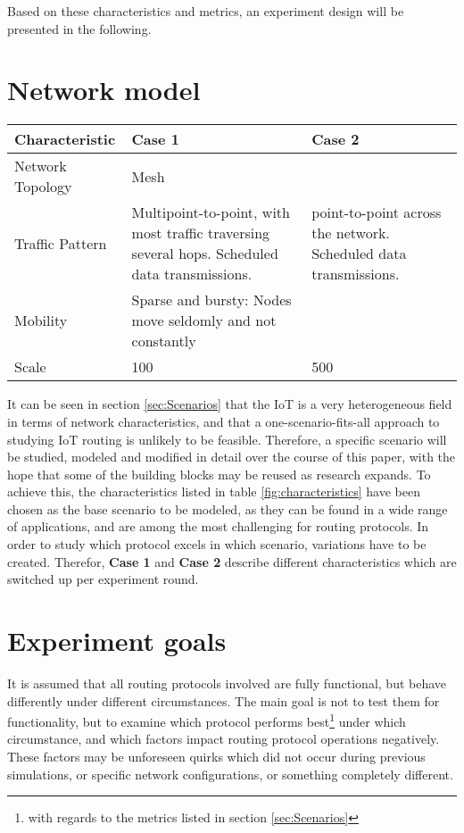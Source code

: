 \documentclass{acm_proc_article-sp}
\begin{document}
Based on these characteristics and metrics, an experiment design will be presented in the following.

\section{Network model}
\label{sec:Model}
\begin{table*}[t]
    \begin{tabularx}{\textwidth}{l | X | X  }
      Characteristic & Case 1 & Case 2 \\
      \hline
      Network Topology & Mesh & \\
      Traffic Pattern & Multipoint-to-point, with most traffic traversing several hops. Scheduled data transmissions. & point-to-point across the network. Scheduled data transmissions. \\
      Mobility & Sparse and bursty: Nodes move seldomly and not constantly & \\
      Scale & 100 & 500\\
    \end{tabularx}
    \caption{Characteristics of the modeled network(s)}
    \label{fig:characteristics}
\end{table*}

It can be seen in section \ref{sec:Scenarios} that the IoT is a very heterogeneous field in terms of network characteristics, and that a one-scenario-fits-all approach to studying IoT routing is unlikely to be feasible. Therefore, a specific scenario will be studied, modeled and modified in detail over the course of this paper, with the hope that some of the building blocks may be reused as research expands. To achieve this, the characteristics listed in table \ref{fig:characteristics} have been chosen as the base scenario to be modeled, as they can be found in a wide range of applications, and are among the most challenging for routing protocols.
In order to study which protocol excels in which scenario, variations have to be created. Therefor, \textbf{Case 1} and \textbf{Case 2} describe different characteristics which are switched up per experiment round.


\section{Experiment goals}
\label{sec:Goals}
It is assumed that all routing protocols involved are fully functional, but behave differently under different circumstances. The main goal is not to test them for functionality, but to examine which protocol performs best\footnote{ with regards to the metrics listed in section \ref{sec:Scenarios}} under which circumstance, and which factors impact routing protocol operations negatively. These factors may be unforeseen quirks which did not occur during previous simulations, or specific network configurations, or something completely different.\\
\end{document}
